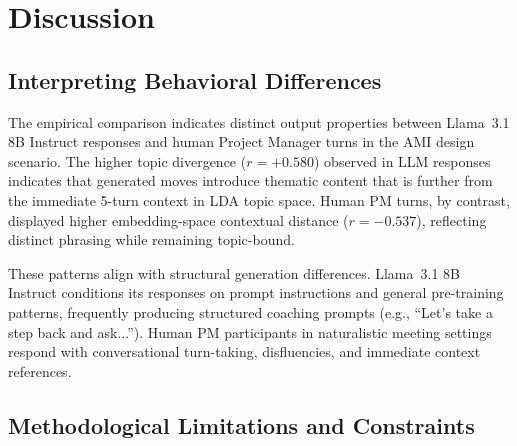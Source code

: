\documentclass[preprint,12pt,authoryear]{elsarticle}
\begin{document}
\section{Discussion}

\subsection{Interpreting Behavioral Differences}

The empirical comparison indicates distinct output properties between Llama~3.1 8B Instruct responses and human Project Manager turns in the AMI design scenario. The higher topic divergence ($r = +0.580$) observed in LLM responses indicates that generated moves introduce thematic content that is further from the immediate 5-turn context in LDA topic space. Human PM turns, by contrast, displayed higher embedding-space contextual distance ($r = -0.537$), reflecting distinct phrasing while remaining topic-bound.

These patterns align with structural generation differences. Llama~3.1 8B Instruct conditions its responses on prompt instructions and general pre-training patterns, frequently producing structured coaching prompts (e.g., ``Let's take a step back and ask...''). Human PM participants in naturalistic meeting settings respond with conversational turn-taking, disfluencies, and immediate context references.

\subsection{Methodological Limitations and Constraints}
\end{document}
